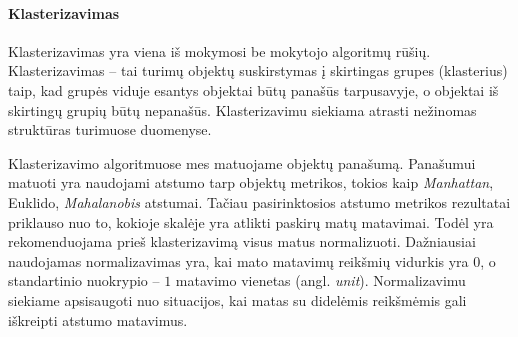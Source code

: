 



\paragraph{Klasterizavimas}

Klasterizavimas yra viena iš mokymosi be mokytojo algoritmų rūšių. Klasterizavimas -- tai turimų objektų suskirstymas į skirtingas grupes (klasterius) taip, kad grupės viduje esantys objektai būtų panašūs tarpusavyje, o objektai iš skirtingų grupių būtų nepanašūs. Klasterizavimu siekiama atrasti nežinomas struktūras turimuose duomenyse. 

Klasterizavimo algoritmuose mes matuojame objektų panašumą. Panašumui matuoti yra naudojami atstumo tarp objektų metrikos, tokios kaip \textit{Manhattan}, Euklido, \textit{Mahalanobis} atstumai. Tačiau pasirinktosios atstumo metrikos rezultatai priklauso nuo to, kokioje skalėje yra atlikti paskirų matų matavimai. Todėl yra rekomenduojama prieš klasterizavimą visus matus normalizuoti. Dažniausiai naudojamas normalizavimas yra, kai mato matavimų reikšmių vidurkis yra $0$, o standartinio nuokrypio -- $1$ matavimo vienetas (angl. \textit{unit}). Normalizavimu siekiame apsisaugoti nuo situacijos, kai matas su didelėmis reikšmėmis gali iškreipti atstumo matavimus. 

